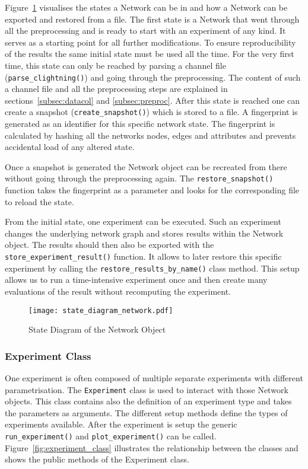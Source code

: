 \documentclass[final]{fhnwreport}       %
\begin{document}
Figure~\ref{fig:state_network} visualises the states a Network can be in and how a Network can be exported and restored from a file. The first state is a Network that went through all the preprocessing and is ready to start with an experiment of any kind. It serves as a starting point for all further modifications. To ensure reproducibility of the results the same initial state must be used all the time. For the very first time, this state can only be reached by parsing a channel file (\texttt{parse_clightning()}) and going through the preprocessing. The content of such a channel file and all the preprocessing steps are explained in sections~\ref{subsec:datacol} and \ref{subsec:preproc}. After this state is reached one can create a snapshot (\texttt{create_snapshot()}) which is stored to a file. A fingerprint is generated as an identifier for this specific network state. The fingerprint is calculated by hashing all the networks nodes, edges and attributes and prevents accidental load of any altered state.

Once a snapshot is generated the Network object can be recreated from there without going through the preprocessing again. The \texttt{restore_snapshot()} function takes the fingerprint as a parameter and looks for the corresponding file to reload the state. 

From the initial state, one experiment can be executed. Such an experiment changes the underlying network graph and stores results within the Network object. The results should then also be exported with the \texttt{store_experiment_result()} function. It allows to later restore this specific experiment by calling the \texttt{restore_results_by_name()} class method. This setup allows us to run a time-intensive experiment once and then create many evaluations of the result without recomputing the experiment. 

\begin{figure}[H]
\centering
\texttt{[image: state\_diagram\_network.pdf]}
\caption{State Diagram of the Network Object}
\label{fig:state_network}
\end{figure}

\subsubsection{Experiment Class}
One experiment is often composed of multiple separate experiments with different parametrisation. The \texttt{Experiment} class is used to interact with those Network objects. This class contains also the definition of an experiment type and takes the parameters as arguments. The different setup methods define the types of experiments available. After the experiment is setup the generic \texttt{run_experiment()} and \texttt{plot_experiment()} can be called. Figure~\ref{fig:experiment_class} illustrates the relationship between the classes and shows the public methods of the Experiment class.
\end{document}
